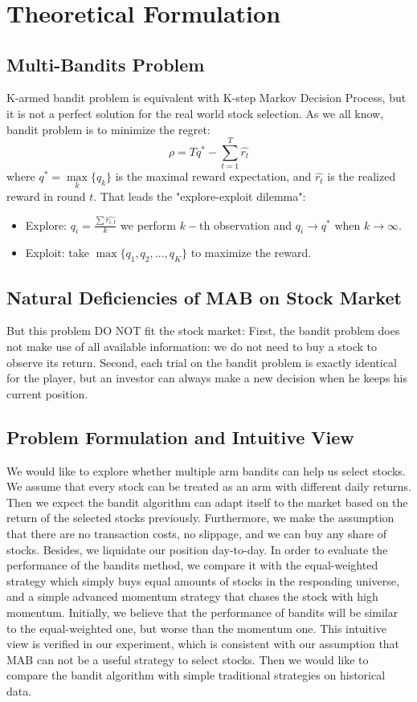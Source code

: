 \documentclass{article}
\title{     }
\author{     }
\date{     }
\begin{document}
\section{Theoretical Formulation}
\subsection{Multi-Bandits Problem} 
K-armed bandit problem is equivalent with K-step Markov Decision Process, but it is not a perfect solution for the real world stock selection.
As we all know, bandit problem is to minimize the regret:
$$
\rho = Tq^*-\sum\limits_{t=1}^{T}\hat{r_t}
$$
where $q^*=\max\limits_{k}\{q_k\}$ is the maximal reward expectation, and $\hat{r_t}$ is the realized reward in round  $t$.
That leads the "explore-exploit dilemma":
\begin{itemize}
    \item  Explore: $q_i = \frac{\sum \hat{r_{i,t}}}{k}$ we perform $k-$th observation and $q_i \to q^*$ when $k \to \infty$.
    \item  Exploit: take $\max\{q_1,q_2,\dots,q_K\}$ to maximize the reward.
    \end{itemize}
\subsection{Natural Deficiencies of MAB on Stock Market}    
But this problem DO NOT fit the stock market:
First, the bandit problem does not make use of all available information: we do not need to buy a stock to observe its return. Second, each trial on the bandit problem is exactly identical for the player, but an investor can always make a new decision when he keeps his current position.
    
\subsection{Problem Formulation and Intuitive View}
We would like to explore whether multiple arm bandits can help us select stocks. We assume that every stock can be treated as an arm with different daily returns. Then we expect the bandit algorithm can adapt itself to the market based on the return of the selected stocks previously. Furthermore, we make the assumption that there are no transaction costs, no slippage, and we can buy any share of stocks. Besides, we liquidate our position day-to-day.
In order to evaluate the performance of the bandits method, we compare it with the equal-weighted strategy which simply buys equal amounts of stocks in the responding universe, and a simple advanced momentum strategy that chases the stock with high momentum.   
Initially, we believe that the performance of bandits will be similar to the equal-weighted one, but worse than the momentum one. This intuitive view is verified in our experiment, which is consistent with our assumption that MAB can not be a useful strategy to select stocks.
Then we would like to compare the bandit algorithm with simple traditional strategies on historical data.
\end{document}
